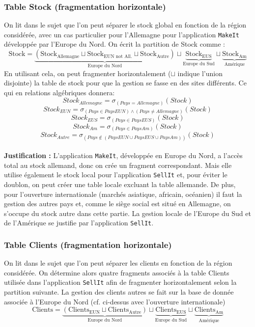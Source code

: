 \documentclass[10pt,a4paper]{article}
\theoremstyle{plain}
\begin{document}
\subsubsection{Table Stock (fragmentation horizontale)}
On lit dans le sujet que l'on peut séparer le stock global en fonction de la région considérée, avec un cas particulier pour l'Allemagne pour l'application \verb|MakeIt| développée par l'Europe du Nord. On écrit la partition de Stock comme :
\[\text{Stock}=\underbrace{(\text{Stock}_{\text{Allemagne}}\sqcup\text{Stock}_{\text{EUN not All.}}\sqcup\text{Stock}_{\text{Autre}})}_{\text{Europe du Nord}}\sqcup\underbrace{\text{Stock}_{\text{EUS}}}_{\text{Europe du Sud}}\sqcup\underbrace{\text{Stock}_{\text{Am}}}_{\text{Amérique}}\]
En utilisant cela, on peut fragmenter horizontalement ($\sqcup$ indique l'union disjointe) la table de stock pour que la gestion se fasse en des sites différents.
Ce qui en relations algébriques donnera:
\[Stock_{Allemagne} = \sigma_{(Pays = Allemagne)}(Stock)\]
\[Stock_{EUN} = \sigma_{(Pays \in PaysEUN) \land (Pays \neq Allemagne)}(Stock)\]
\[Stock_{EUS} = \sigma_{(Pays \in PaysEUS)}(Stock)\]
\[Stock_{Am} = \sigma_{(Pays \in PaysAm)}(Stock)\]
\[Stock_{Autre} = \sigma_{(Pays \not\in (PaysEUN \cup PaysEUS \cup PaysAm))}(Stock)\]
\\
\textbf{Justification :} L'application \verb|MakeIt|, développée en Europe du Nord, a l'accès total au stock allemand, donc on crée un fragment correspondant. Mais elle utilise également le stock local pour l'application \verb|SellIt| et, pour éviter le doublon, on peut créer une table locale excluant la table allemande. De plus, pour l'ouverture internationale (marchés asiatique, africain, océanien) il faut la gestion des autres pays et, comme le siège social est situé en Allemagne, on s'occupe du stock autre dans cette partie. La gestion locale de l'Europe du Sud et de l'Amérique se justifie par l'application \verb|SellIt|. 

\subsubsection{Table Clients (fragmentation horizontale)}
On lit dans le sujet que l'on peut séparer les clients en fonction de la région considérée. On détermine alors quatre fragments associés à la table Clients utilisée dans l'application \verb|SellIt| afin de fragmenter horizontalement selon la partition suivante. La gestion des clients autres se fait sur la base de donnée associée à l'Europe du Nord (cf. ci-dessus avec l'ouverture internationale)
\[\text{Clients}=\underbrace{(\text{Clients}_{\text{EUN}}\sqcup\text{Clients}_{\text{Autre}})}_{\text{Europe du Nord}}\sqcup\underbrace{\text{Clients}_{\text{EUS}}}_{\text{Europe du Sud}}\sqcup\underbrace{\text{Clients}_{\text{Am}}}_{\text{Amérique}}\]
\end{document}
